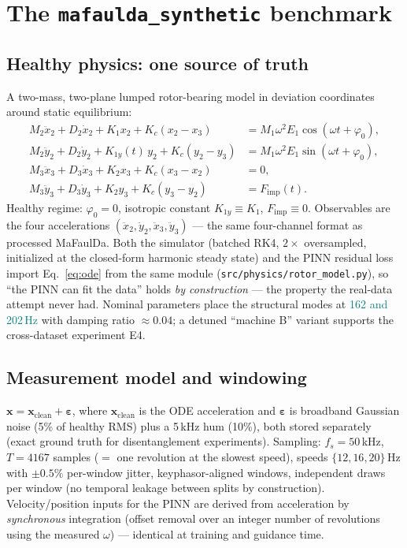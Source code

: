 \documentclass[11pt]{article}
\newcommand{\x}{\mathbf{x}}
\newcommand{\measured}[1]{\textcolor{teal}{#1}}
\newcommand{\code}[1]{\texttt{\small #1}}
\begin{document}
\section{The \code{mafaulda\_synthetic} benchmark}
\label{sec:benchmark}

\subsection{Healthy physics: one source of truth}
A two-mass, two-plane lumped rotor-bearing model in deviation coordinates
around static equilibrium:
\begin{align}
M_2\ddot{x}_2 + D_2\dot{x}_2 + K_1 x_2 + K_c(x_2-x_3) &= M_1\omega^2 E_1\cos(\omega t + \varphi_0),\nonumber\\
M_2\ddot{y}_2 + D_2\dot{y}_2 + K_{1y}(t)\, y_2 + K_c(y_2-y_3) &= M_1\omega^2 E_1\sin(\omega t + \varphi_0),\nonumber\\
M_3\ddot{x}_3 + D_3\dot{x}_3 + K_2 x_3 + K_c(x_3-x_2) &= 0,\nonumber\\
M_3\ddot{y}_3 + D_3\dot{y}_3 + K_2 y_3 + K_c(y_3-y_2) &= F_{\mathrm{imp}}(t).
\label{eq:ode}
\end{align}
Healthy regime: $\varphi_0=0$, isotropic constant $K_{1y}\equiv K_1$,
$F_{\mathrm{imp}}\equiv 0$. Observables are the four accelerations
$(\ddot{x}_2,\ddot{y}_2,\ddot{x}_3,\ddot{y}_3)$ --- the same four-channel
format as processed MaFaulDa. Both the simulator (batched RK4, $2\times$
oversampled, initialized at the closed-form harmonic steady state) and the
PINN residual loss import Eq.~\eqref{eq:ode} from the same module
(\code{src/physics/rotor\_model.py}), so ``the PINN can fit the data'' holds
\emph{by construction} --- the property the real-data attempt never had.
Nominal parameters place the structural modes at
\measured{162 and 202\,Hz} with damping ratio $\approx 0.04$; a detuned
``machine B'' variant supports the cross-dataset experiment E4.

\subsection{Measurement model and windowing}
$\x = \x_{\mathrm{clean}} + \boldsymbol{\varepsilon}$, where
$\x_{\mathrm{clean}}$ is the ODE acceleration and $\boldsymbol{\varepsilon}$
is broadband Gaussian noise (5\% of healthy RMS) plus a 5\,kHz hum (10\%),
both stored separately (exact ground truth for disentanglement experiments).
Sampling: $f_s = 50$\,kHz, $T=4167$ samples ($=$ one revolution at the
slowest speed), speeds $\{12, 16, 20\}$\,Hz with $\pm 0.5\%$ per-window
jitter, keyphasor-aligned windows, independent draws per window (no temporal
leakage between splits by construction). Velocity/position inputs for the
PINN are derived from acceleration by \emph{synchronous} integration
(offset removal over an integer number of revolutions using the measured
$\omega$) --- identical at training and guidance time.
\end{document}
